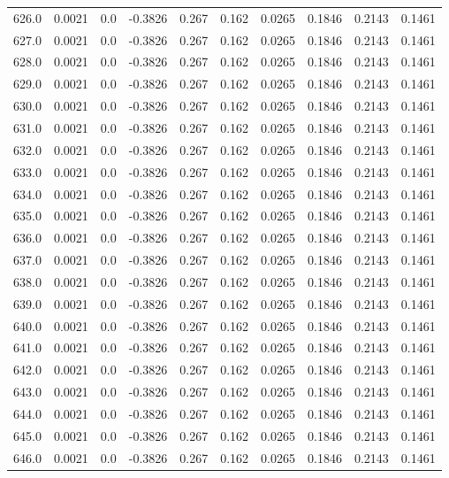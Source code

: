 \begin{longtable}{lrrrrrrrrr}
626.0 & 0.0021 & 0.0 & -0.3826 & 0.267 & 0.162 & 0.0265 & 0.1846 & 0.2143 & 0.1461 \\
627.0 & 0.0021 & 0.0 & -0.3826 & 0.267 & 0.162 & 0.0265 & 0.1846 & 0.2143 & 0.1461 \\
628.0 & 0.0021 & 0.0 & -0.3826 & 0.267 & 0.162 & 0.0265 & 0.1846 & 0.2143 & 0.1461 \\
629.0 & 0.0021 & 0.0 & -0.3826 & 0.267 & 0.162 & 0.0265 & 0.1846 & 0.2143 & 0.1461 \\
630.0 & 0.0021 & 0.0 & -0.3826 & 0.267 & 0.162 & 0.0265 & 0.1846 & 0.2143 & 0.1461 \\
631.0 & 0.0021 & 0.0 & -0.3826 & 0.267 & 0.162 & 0.0265 & 0.1846 & 0.2143 & 0.1461 \\
632.0 & 0.0021 & 0.0 & -0.3826 & 0.267 & 0.162 & 0.0265 & 0.1846 & 0.2143 & 0.1461 \\
633.0 & 0.0021 & 0.0 & -0.3826 & 0.267 & 0.162 & 0.0265 & 0.1846 & 0.2143 & 0.1461 \\
634.0 & 0.0021 & 0.0 & -0.3826 & 0.267 & 0.162 & 0.0265 & 0.1846 & 0.2143 & 0.1461 \\
635.0 & 0.0021 & 0.0 & -0.3826 & 0.267 & 0.162 & 0.0265 & 0.1846 & 0.2143 & 0.1461 \\
636.0 & 0.0021 & 0.0 & -0.3826 & 0.267 & 0.162 & 0.0265 & 0.1846 & 0.2143 & 0.1461 \\
637.0 & 0.0021 & 0.0 & -0.3826 & 0.267 & 0.162 & 0.0265 & 0.1846 & 0.2143 & 0.1461 \\
638.0 & 0.0021 & 0.0 & -0.3826 & 0.267 & 0.162 & 0.0265 & 0.1846 & 0.2143 & 0.1461 \\
639.0 & 0.0021 & 0.0 & -0.3826 & 0.267 & 0.162 & 0.0265 & 0.1846 & 0.2143 & 0.1461 \\
640.0 & 0.0021 & 0.0 & -0.3826 & 0.267 & 0.162 & 0.0265 & 0.1846 & 0.2143 & 0.1461 \\
641.0 & 0.0021 & 0.0 & -0.3826 & 0.267 & 0.162 & 0.0265 & 0.1846 & 0.2143 & 0.1461 \\
642.0 & 0.0021 & 0.0 & -0.3826 & 0.267 & 0.162 & 0.0265 & 0.1846 & 0.2143 & 0.1461 \\
643.0 & 0.0021 & 0.0 & -0.3826 & 0.267 & 0.162 & 0.0265 & 0.1846 & 0.2143 & 0.1461 \\
644.0 & 0.0021 & 0.0 & -0.3826 & 0.267 & 0.162 & 0.0265 & 0.1846 & 0.2143 & 0.1461 \\
645.0 & 0.0021 & 0.0 & -0.3826 & 0.267 & 0.162 & 0.0265 & 0.1846 & 0.2143 & 0.1461 \\
646.0 & 0.0021 & 0.0 & -0.3826 & 0.267 & 0.162 & 0.0265 & 0.1846 & 0.2143 & 0.1461 \\

\end{longtable}
